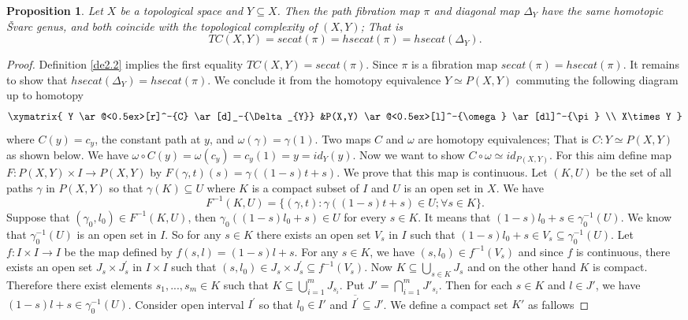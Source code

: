 \documentclass[preprint,11pt %
]{hjm1}
\newtheorem{proposition}[theorem]{Proposition}
\theoremstyle{definition}
\begin{document}
\begin{proposition}\label{P}
Let $X$ be a topological space and $Y \subseteq X$.
Then the path fibration map $\pi$ and diagonal map $\Delta _{Y}$ have the same homotopic \v{S}varc genus, and both coincide with the topological complexity of $(X,Y)$; That is
\[
TC(X,Y) =secat(\pi) =hsecat(\pi) = hsecat(\Delta _{Y}).
\]
\end{proposition}

\begin{proof}
Definition \ref{de2.2} implies the first equality $TC(X,Y) =secat(\pi)$. Since $\pi$ is a fibration map 
$secat(\pi) =hsecat(\pi)$.
It remains to show that  $hsecat(\Delta _{Y})=hsecat(\pi)$.  We conclude it from the homotopy equivalence $Y\simeq P(X,Y)$  commuting the following diagram up to homotopy
\[
\xymatrix{
Y \ar@<0.5ex>[r]^-{C} \ar[d]_-{\Delta _{Y}}  &P(X,Y) \ar@<0.5ex>[l]^-{\omega } \ar[dl]^-{\pi} \\
X\times Y
}
\]
where $C(y)=c_y$, the constant path at $y$, and $\omega (\gamma)=\gamma (1)$.
Two maps $C$ and $\omega$ are homotopy equivalences; That is $C:Y\simeq P(X,Y)$ as shown below. We have $\omega \circ C(y)=\omega (c_y)=c_y(1)=y=id_Y(y)$. Now we want to show $C \circ \omega \simeq id_{P(X,Y)}$. For this aim define map $F:P(X,Y)\times I\to P(X,Y)$ by $F(\gamma , t)(s)=\gamma ((1-s)t+s)$. We prove that this map is continuous. Let $(K,U)$ be the set of all paths $\gamma $ in $P(X,Y)$ so that $\gamma (K)\subseteq U$ where $K$ is a compact subset of $I$ and $U$ is an open set in $X$. We have 
\[
F^{-1}(K,U)=\lbrace (\gamma ,t):\gamma ((1-s)t+s)\in U;\forall s\in K \rbrace .
\]
Suppose that $(\gamma_0,l_0)\in F^{-1}(K,U)$, then $\gamma _0((1-s)l_0+s)\in U$ for every $s\in K$. It means that $(1-s)l_0+s\in \gamma _0^{-1}(U)$. We know that $\gamma _0^{-1}(U)$ is an open set in $I$. So for any 
$s\in K$ there exists an open set $V_s$ in $I$ such that $(1-s)l_0+s\in V_s \subseteq \gamma_0^{-1}(U)$. Let $f:I\times I\to I$ be the map defined by $f(s,l)=(1-s)l+s$. For any $s\in K$, we have $(s,l_0)\in f^{-1}(V_s)$ and since $f$ is continuous, there exists an open set $J_s \times J^{'}_s$ in $I\times I$ such that $(s,l_0)\in J_s \times J^{'}_s \subseteq f^{-1}(V_s)$. Now $K\subseteq \bigcup _{s\in K}J_s$ and on the other hand $K$ is compact. Therefore there exist elements $s_1,...,s_m\in K$ such that $K\subseteq \bigcup _{i=1}^{m}J_{s_i}$. Put $J{'}=\bigcap _{i=1}^{m}J{'}_{s_i}$. Then for each $s\in K$ and $l\in J{'}$, we have $(1-s)l+s\in \gamma _0^{-1}(U)$. Consider open interval $I^{'}$ so that $l_0 \in I'$ and $\overline{I^{'}}\subseteq J{'}$. We define a compact set $K{'}$ as fallows

\end{proof}
\end{document}
